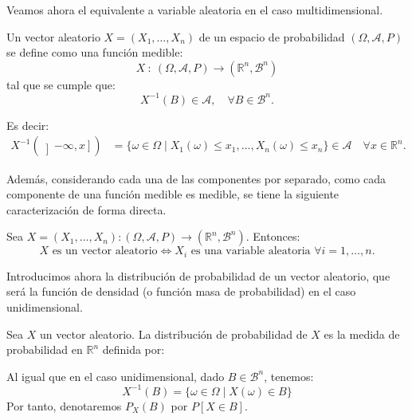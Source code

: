 Veamos ahora el equivalente a variable aleatoria en el caso multidimensional.
\begin{definicion}
    Un vector aleatorio $X=(X_1, \ldots, X_n)$ de un espacio de probabilidad $(\Omega, \mathcal{A}, P)$ se define como una función medible:
    \begin{equation*}
        X~:~(\Omega, \mathcal{A}, P) \to (\mathbb{R}^n, \mathcal{B}^n)
    \end{equation*}
    tal que se cumple que:
    \begin{equation*}
        X^{-1}(B)\in \mathcal{A}, \quad \forall B\in \mathcal{B}^n.
    \end{equation*}
\end{definicion}

Es decir:
\begin{align*}
    X^{-1}(\left]-\infty, x\right]) &= \{\omega\in \Omega \mid X_1(\omega)\leq x_1, \ldots, X_n(\omega)\leq x_n\} \in \mathcal{A}
    \quad \forall x\in \mathbb{R}^n.
\end{align*}

Además, considerando cada una de las componentes por separado, como cada componente de una función medible es medible, se tiene la siguiente caracterización de forma directa.
\begin{teo}
    Sea $X=(X_1, \ldots, X_n): (\Omega, \mathcal{A}, P) \to (\mathbb{R}^n, \mathcal{B}^n)$. Entonces:
    \begin{equation*}
        X \text{ es un vector aleatorio} \iff X_i \text{ es una variable aleatoria } \forall i=1, \ldots, n.
    \end{equation*}
\end{teo}

Introducimos ahora la distribución de probabilidad de un vector aleatorio, que será la función de densidad (o función masa de probabilidad) en el caso unidimensional.
\begin{definicion}
    Sea $X$ un vector aleatorio. La distribución de probabilidad de $X$ es la medida de probabilidad en $\mathbb{R}^n$ definida por:
\end{definicion}

\begin{notacion}
    Al igual que en el caso unidimensional, dado $B\in \mathcal{B}^n$, tenemos:
    \begin{equation*}
        X^{-1}(B) = \{\omega\in \Omega \mid X(\omega)\in B\}
    \end{equation*}
    Por tanto, denotaremos $P_X(B)$ por $P[X\in B]$.
\end{notacion}

